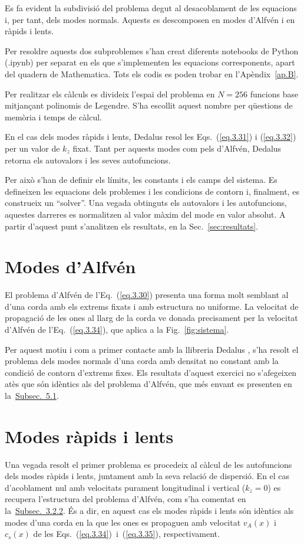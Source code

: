 Es fa evident la subdivisió del problema degut al desacoblament de les equacions i, per tant, dels modes normals.
Aquests es descomposen en modes d'Alfvén i en ràpids i lents.

Per resoldre aquests dos subproblemes s'han creat diferents notebooks de Python (.ipynb) per separat en els que s'implementen les equacions corresponents,
apart del quadern de Mathematica. Tots els codis es poden trobar en l'Apèndix~\ref{ap.B}. %

Per realitzar els càlculs es divideix l'espai del problema en $N = 256$ funcions base mitjançant polinomis de Legendre.
S'ha escollit aquest nombre per qüestions de memòria i temps de càlcul.

En el cas dels modes ràpids i lents, Dedalus resol les Eqs.~(\ref{eq.3.31}) i (\ref{eq.3.32}) per un valor de $k_z$ fixat.
Tant per aquests modes com pels d'Alfvén, Dedalus retorna els autovalors i les seves autofuncions.

Per això s'han de definir els límits, les constants i els camps del sistema.
Es defineixen les equacions dels problemes i les condicions de contorn i, finalment, es construeix un ``solver''.
Una vegada obtinguts els autovalors i les autofuncions, aquestes darreres es normalitzen al valor màxim del mode en valor absolut.
A partir d'aquest punt s'analitzen els resultats, en la Sec.~\ref{sec:resultats}.


\section{Modes d'Alfvén} \label{subsec:mètode_Alfvén}
El problema d'Alfvén de l'Eq.~(\ref{eq.3.30}) presenta una forma molt semblant al d'una corda amb els extrems fixats i amb estructura no uniforme.
La velocitat de propagació de les ones al llarg de la corda ve donada precisament per la velocitat d'Alfvén de l'Eq.~(\ref{eq.3.34}), que aplica a la Fig.~\ref{fig:sistema}.

Per aquest motiu i com a primer contacte amb la llibreria Dedalus \parencite{Dedalus},
s'ha resolt el problema dels modes normals d'una corda amb densitat no constant amb la condició de contorn d'extrems fixes.
Els resultats d'aquest exercici no s'afegeixen atès que són idèntics als del problema d'Alfvén,
que més envant es presenten en la~\hyperref[subsec:resultats_modes_Alfvén]{Subsec.~5.1}.


\section{Modes ràpids i lents} \label{subsec:mètode_r_i_l}
Una vegada resolt el primer problema es procedeix al càlcul de les autofuncions dels modes ràpids i lents, juntament amb la seva relació de dispersió.
En el cas d'acoblament nul amb velocitats purament longitudinal i vertical ($k_z = 0$) es recupera l'estructura del problema d'Alfvén,
com s'ha comentat en la~\hyperref[subsubsec:ones_modes_r_i_l]{Subsec.~3.2.2}.
És a dir, en aquest cas els modes ràpids i lents són idèntics als modes d'una corda en la que les ones es propaguen amb velocitat $v_A(x)$ i $c_s(x)$ de les Eqs.~(\ref{eq.3.34})~i~(\ref{eq.3.35}), respectivament.

